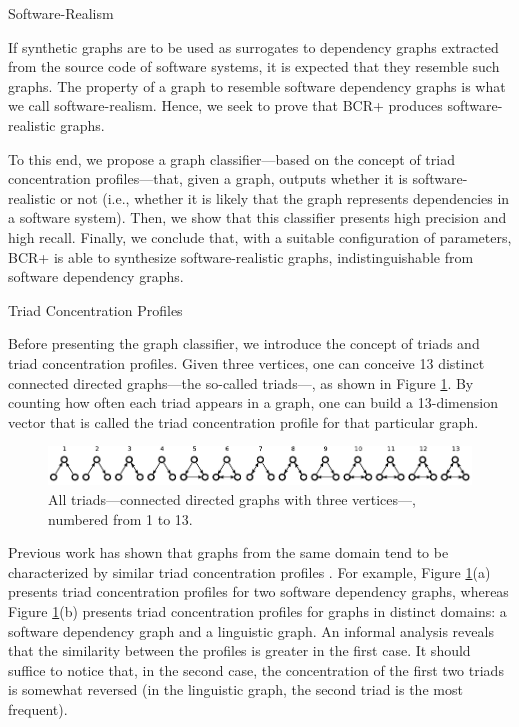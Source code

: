 \documentclass[11pt,twocolumn,a4paper,english]{article}
\begin{document}
\begin{section}{Software-Realism}

	If synthetic graphs are to be used as surrogates to dependency graphs extracted from the source code of software systems, it is expected that they resemble such graphs. The property of a graph to resemble software dependency graphs is what we call software-realism. Hence, we seek to prove that BCR+ produces software-realistic graphs.
	
	To this end, we propose a graph classifier---based on the concept of triad concentration profiles---that, given a graph, outputs whether it is software-realistic or not (i.e., whether it is likely that the graph represents dependencies in a software system). Then, we show that this classifier presents high precision and high recall. Finally, we conclude that, with a suitable configuration of parameters, BCR+ is able to synthesize software-realistic graphs, indistinguishable from software dependency graphs.
		
\begin{subsection}{Triad Concentration Profiles}
	
	Before presenting the graph classifier, we introduce the concept of triads and triad concentration profiles. Given three vertices, one can conceive 13 distinct connected directed graphs---the so-called triads---, as shown in Figure \ref{fig:triads}. By counting how often each triad appears in a graph, one can build a 13-dimension vector that is called the triad concentration profile for that particular graph. %

	\begin{figure}[htbp]
		\centering
			\includegraphics[scale=1]{figures/triads}
		\caption{All triads---connected directed graphs with three vertices---, numbered from 1 to 13.}
		\label{fig:triads}
	\end{figure}
	
	Previous work has shown that graphs from the same domain tend to be characterized by similar triad concentration profiles \cite{Milo2002}. For example, Figure \ref{fig:triads}(a) presents triad concentration profiles for two software dependency graphs, whereas Figure \ref{fig:triads}(b) presents triad concentration profiles for graphs in distinct domains: a software dependency graph and a linguistic graph. An informal analysis reveals that the similarity between the profiles is greater in the first case. It should suffice to notice that, in the second case, the concentration of the first two triads is somewhat reversed (in the linguistic graph, the second triad is the most frequent).


\end{subsection}
\end{section}
\end{document}
